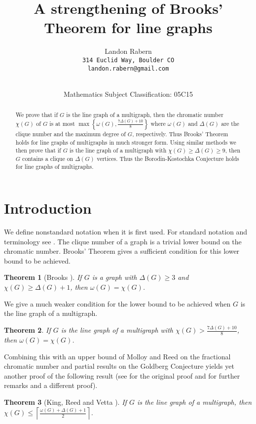 \documentclass[12pt]{article}
\title{A strengthening of Brooks' Theorem for line graphs}
\author{Landon Rabern\\
\small \texttt{314 Euclid Way, Boulder CO} \\
\small \texttt{landon.rabern@gmail.com}}
\date{\dateline{Feb 10, 2010}{Jun 20, 2011}\\
\small Mathematics Subject Classification: 05C15}
\theoremstyle{plain}
\newtheorem{thm}{Theorem}
\theoremstyle{definition}
\theoremstyle{remark}
\begin{document}
\maketitle
\begin{abstract}
\noindent We prove that if $G$ is the line graph of a multigraph, then the
chromatic number $\chi(G)$ of $G$ is at most $\max\left\{\omega(G), \frac{7\Delta(G) + 10}{8}\right\}$ where $\omega(G)$ and $\Delta(G)$ are the  clique number and the maximum degree of $G$, respectively.  Thus Brooks' Theorem holds for line graphs of multigraphs in much stronger form.  Using similar methods we then prove that if $G$ is the line graph of a multigraph with $\chi(G) \geq \Delta(G) \geq 9$, then $G$ contains a clique on $\Delta(G)$ vertices. Thus the Borodin-Kostochka Conjecture holds for line graphs of multigraphs.
\end{abstract}

\section{Introduction}
We define nonstandard notation when it is first used.  For standard notation and terminology see \cite{bondy2008graph}. The clique number of a graph is a trivial lower bound on the chromatic number. Brooks' Theorem gives a sufficient condition for this lower bound to be achieved.

\begin{thm}[Brooks \cite{brooks1941colouring}]
If $G$ is a graph with $\Delta(G) \geq 3$ and $\chi(G) \geq \Delta(G) + 1$, then $\omega(G) = \chi(G)$.
\end{thm}

We give a much weaker condition for the lower bound to be achieved when $G$ is the line graph of a multigraph.

\begin{thm}
If $G$ is the line graph of a multigraph with $\chi(G) > \frac{7\Delta(G) + 10}{8}$, then $\omega(G) = \chi(G)$.
\end{thm}

Combining this with an upper bound of Molloy and Reed \cite{molloy2002graph} on the fractional chromatic number and partial results on the Goldberg Conjecture \cite{StiebitzVizingGoldberg} yields yet another proof of the following result (see \cite{king2007upper} for the original proof and \cite{rabernhitting} for further remarks and a different proof).

\begin{thm}[King, Reed and Vetta \cite{king2007upper}]
If $G$ is the line graph of a multigraph, then $\chi(G) \leq \left\lceil \frac{\omega(G) + \Delta(G) + 1}{2}\right\rceil$.
\end{thm}
\end{document}
